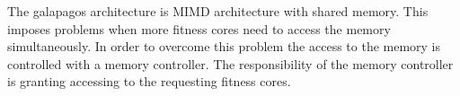 The galapagos architecture is MIMD architecture with shared memory. This imposes problems when more fitness cores need to access the memory simultaneously. In order to overcome this problem the access to the memory is controlled with a memory controller. The responsibility of the memory controller is granting accessing to the requesting fitness cores. 
